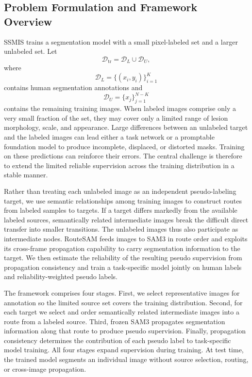 \documentclass[a4paper,fleqn]{cas-dc}
\begin{document}
\subsection{Problem Formulation and Framework Overview}
\label{sec:framework-overview}

SSMIS trains a segmentation model with a small pixel-labeled set and a larger unlabeled set. Let
\begin{equation}
\mathcal{D}_{\mathrm{tr}}=\mathcal{D}_{L}\cup\mathcal{D}_{U},
\end{equation}
where
\begin{equation}
\mathcal{D}_{L}=\{(x_i,y_i)\}_{i=1}^{K}
\end{equation}
contains human segmentation annotations and
\begin{equation}
\mathcal{D}_{U}=\{x_j\}_{j=1}^{N-K}
\end{equation}
contains the remaining training images. When labeled images comprise only a very small fraction of the set, they may cover only a limited range of lesion morphology, scale, and appearance. Large differences between an unlabeled target and the labeled images can lead either a task network or a promptable foundation model to produce incomplete, displaced, or distorted masks. Training on these predictions can reinforce their errors. The central challenge is therefore to extend the limited reliable supervision across the training distribution in a stable manner.

Rather than treating each unlabeled image as an independent pseudo-labeling target, we use semantic relationships among training images to construct routes from labeled samples to targets. If a target differs markedly from the available labeled sources, semantically related intermediate images break the difficult direct transfer into smaller transitions. The unlabeled images thus also participate as intermediate nodes. RouteSAM feeds images to SAM3 in route order and exploits its cross-frame propagation capability to carry segmentation information to the target. We then estimate the reliability of the resulting pseudo supervision from propagation consistency and train a task-specific model jointly on human labels and reliability-weighted pseudo labels.

The framework comprises four stages. First, we select representative images for annotation so the limited source set covers the training distribution. Second, for each target we select and order semantically related intermediate images into a route from a labeled source. Third, frozen SAM3 propagates segmentation information along that route to produce pseudo supervision. Finally, propagation consistency determines the contribution of each pseudo label to task-specific model training. All four stages expand supervision during training. At test time, the trained model segments an individual image without source selection, routing, or cross-image propagation.
\end{document}
